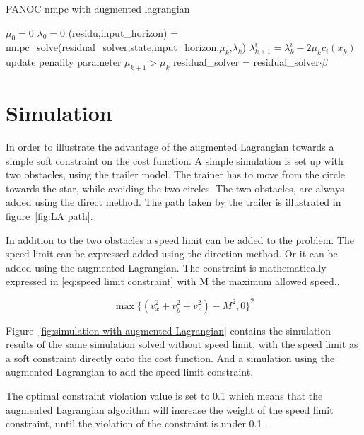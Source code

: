 	\begin{algorithm}
		\caption{PANOC nmpc with augmented lagrangian}
		\label{alg:PANOC with augmented lagrangian}
		\begin{algorithmic}[1]
			\State $\mu_0=0$
			\State $\lambda_0=0$
			\State (residu,input\_horizon) = nmpc\_solve(residual\_solver,state,input\_horizon,$\mu_k$,$\lambda_k$)
			\State $\lambda_{k+1}^{i} = \lambda_{k}^{i} - 2\mu_k c_i(x_k)$
			\State update penality parameter $\mu_{k+1}>\mu_k$
			\State residual\_solver =  residual\_solver$\cdot \beta$
			\EndWhile
			\EndProcedure
		\end{algorithmic}
	\end{algorithm}

\section{Simulation}
In order to illustrate the advantage of the augmented Lagrangian towards a simple soft constraint on the cost function. A simple simulation is set up with two obstacles, using the trailer model. The trainer has to move from the circle towards the star, while avoiding the two circles. The two obstacles, are always added using the direct method. The path taken by the trailer is illustrated in figure~\ref{fig:LA path}.

In addition to the two obstacles a speed limit can be added to the problem. The speed limit can be expressed added using the direction method. Or it can be added using the augmented Lagrangian. The  constraint is mathematically expressed in \eqref{eq:speed limit constraint} with M the maximum allowed speed..

\begin{equation}
\max\{(v_x^2+v_y^2+v_z^2)-M^2,0\}^2
\label{eq:speed limit constraint}
\end{equation}

Figure~\ref{fig:simulation with augmented Lagrangian} contains the simulation results of the same simulation solved without speed limit, with the speed limit as a soft constraint directly onto the cost function. And a simulation using the augmented Lagrangian to add the speed limit constraint.

The optimal constraint violation value is set to 0.1 which means that the augmented Lagrangian algorithm will increase the weight of the speed limit constraint, until the violation of the constraint is under 0.1 . 

